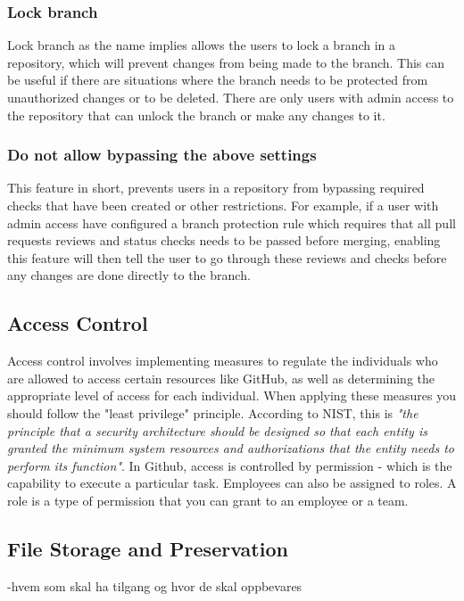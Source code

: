 \subsubsection{Lock branch}
Lock branch as the name implies allows the users to lock a branch in a repository, which will prevent changes from being made to the branch. This can be useful if there are situations where the branch needs to be protected from unauthorized changes or to be deleted. There are only users with admin access to the repository that can unlock the branch or make any changes to it. 

\subsubsection{Do not allow bypassing the above settings}
This feature in short, prevents users in a repository from bypassing required checks that have been created or other restrictions. For example, if a user with admin access have configured a branch protection rule which requires that all pull requests reviews and status checks needs to be passed before merging, enabling this feature will then tell the user to go through these reviews and checks before any changes are done directly to the branch. 
\newpage

\subsection{Access Control}
Access control involves implementing measures to regulate the individuals who are allowed to access certain resources like GitHub, as well as determining the appropriate level of access for each individual. When applying these measures you should follow the "least privilege" principle. According to NIST, this is \textit{"the principle that a security architecture should be designed so that each entity is granted the minimum system resources and authorizations that the entity needs to perform its function"}\cite{leastprivilege}. In Github, access is controlled by permission - which is the capability to execute a particular task. Employees can also be assigned to roles. A role is a type of permission that you can grant to an employee or a team.\cite{accesscontroll}


 
\subsection{File Storage and Preservation}
-hvem som skal ha tilgang og hvor de skal oppbevares

